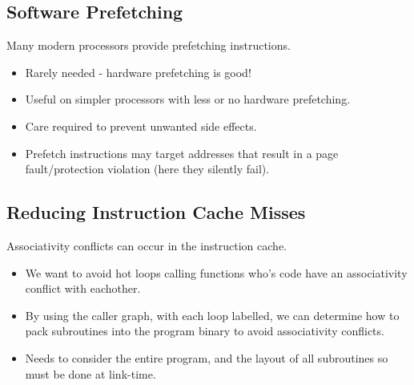 \subsection{Software Prefetching}
Many modern processors provide prefetching instructions.
\begin{itemize}
	\item Rarely needed - hardware prefetching is good!
	\item Useful on simpler processors with less or no hardware prefetching.
	\item Care required to prevent unwanted side effects.
	\item Prefetch instructions may target addresses that result in a page fault/protection violation (here they silently fail).
\end{itemize}

\subsection{Reducing Instruction Cache Misses}
Associativity conflicts can occur in the instruction cache.
\begin{itemize}
	\item We want to avoid hot loops calling functions who's code have an associativity conflict with eachother.
	\item By using the caller graph, with each loop labelled, we can determine how to pack subroutines into the program binary to avoid associativity conflicts.
	\item Needs to consider the entire program, and the layout of all subroutines so must be done at link-time.
\end{itemize}


